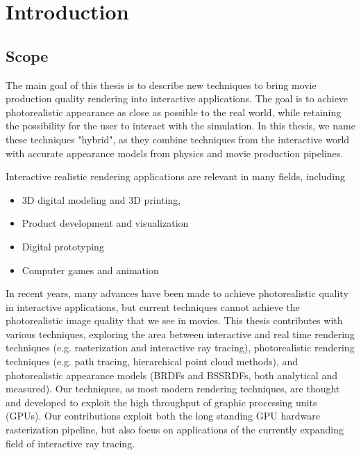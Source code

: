 \chapter{Introduction}



\label{sec:intro}
\section{Scope}
The main goal of this thesis is to describe new techniques to bring movie production quality rendering into interactive applications.  The goal is to achieve photorealistic appearance as close as possible to the real world, while retaining the possibility for the user to interact with the simulation. In this thesis, we name these techniques "hybrid", as they combine techniques from the interactive world with accurate appearance models from physics and movie production pipelines.

Interactive realistic rendering applications are relevant in many fields, including
\begin{itemize}
\item 3D digital modeling and 3D printing,
\item Product development and visualization
\item Digital prototyping
\item Computer games and animation
\end{itemize}
In recent years, many advances have been made to achieve photorealistic quality in interactive applications,  but current techniques cannot achieve the photorealistic image quality that we see in movies. This thesis contributes with various techniques, exploring the area between interactive and real time rendering techniques (e.g. rasterization and interactive ray tracing), photorealistic rendering techniques (e.g. path tracing, hierarchical point cloud methods), and photorealistic appearance models (BRDFs and BSSRDFs, both analytical and measured). Our techniques, as most modern rendering techniques, are thought and developed to exploit the high throughput of graphic processing units (GPUs). Our contributions exploit both the long standing GPU hardware rasterization pipeline, but also focus on applications of the currently expanding field of interactive ray tracing. 

